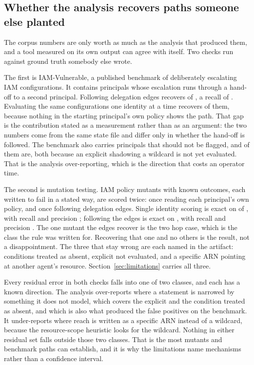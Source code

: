 \subsection{Whether the analysis recovers paths someone else planted}
\label{sec:recovery}

The corpus numbers are only worth as much as the analysis that produced them,
and a tool measured on its own output can agree with itself. Two checks run
against ground truth somebody else wrote.

The first is IAM-Vulnerable, a published benchmark of deliberately escalating
IAM configurations. It contains \nIVPaths principals whose escalation runs
through a hand-off to a second principal. Following delegation edges recovers
\nIVPaths of \nIVPaths, a recall of \recallDelegation. Evaluating the same
configurations one identity at a time recovers \recallSingleIdentity of them,
because nothing in the starting principal's own policy shows the path. That
gap is the contribution stated as a measurement rather than as an argument:
the two numbers come from the same state file and differ only in whether the
hand-off is followed. The benchmark also carries \nIVSafe principals that
should not be flagged, and \nIVFlaggedSafe of them are, both because an
explicit  shadowing a wildcard  is not yet evaluated.
That is the analysis
over-reporting, which is the direction that costs an operator time.

The second is mutation testing. \nMutants IAM policy mutants with known
outcomes, each written to fail in a stated way, are scored twice: once reading
each principal's own policy, and once following delegation edges. Single
identity scoring is exact on \mutExactSingle of \nMutants, with recall
\mutRecallSingle and precision \mutPrecSingle; following the edges is exact on
\mutExactMulti, with recall \mutRecallMulti and precision \mutPrecMulti. The
one mutant the edges recover is the two hop  case, which is
the class the rule was written for. Recovering that one and no others is the
result, not a disappointment. The three that stay
wrong are each named in the artifact: conditions treated as absent, explicit
 not evaluated, and a specific ARN pointing at another agent's
resource. Section~\ref{sec:limitations} carries all three.

Every residual error in both checks falls into one of two classes, and each
has a known direction. The analysis over-reports where a statement is narrowed
by something it does not model, which covers the explicit  and the
condition treated as absent, and which is also what produced the
\nIVFlaggedSafe false positives on the benchmark. It under-reports where reach
is written as a specific ARN instead of a wildcard, because the
resource-scope heuristic looks for the wildcard. Nothing in either residual
set falls outside those two classes. That is the most \nMutants mutants and
\nIVPaths benchmark paths can establish, and it is why the limitations name
mechanisms rather than a confidence interval.


